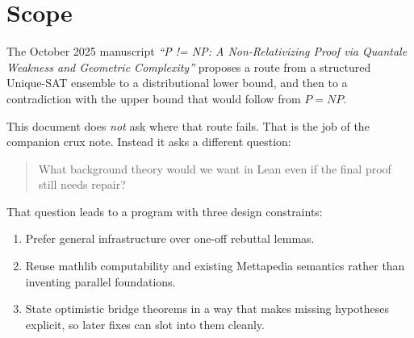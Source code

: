 \documentclass[11pt]{article}
\theoremstyle{remark}
\begin{document}
\begin{abstract}
extractor is reused across the switched family and only the downstream combiner
varies, then the code budget collapses to the combiner alone.
The Meredith-side limit is now considerably sharper.  The currently formalized
weakness bridge exports only global evidence scalars, so any predictor factoring
only through those summaries is constant on the whole state space.  The current
exact HML layer is infinitary by default: if the certified minimal-context type
is infinite, then even the depth-1 fragment is infinite, and the concrete rho
instance already realizes that case.  And one layer below exact HML, the
concrete rho present-moment surface already realizes arbitrary finite
membership patterns on a natural probe slice: a single-output probe state
against a flat bag of input guards records exactly which channels are present in
the environment.
On the semantic side, it now includes a depth-bounded GSLT/HML observational
kernel, a bridge from bisimulation quotients to quantale weakness, and a first
concrete minimal-context instance for the rho calculus.  This isolates the exact
positive shape that a successful switching theorem would need: not mere
locality, but locality together with a concrete compression theorem, a clean
finite learning interface, and an explicit observational/evidence semantics.
\end{abstract}

\tableofcontents

\section{Scope}

The October 2025 manuscript
\emph{``P != NP: A Non-Relativizing Proof via Quantale Weakness and Geometric
Complexity''} proposes a route from a structured Unique-SAT ensemble to a
distributional lower bound, and then to a contradiction with the upper bound that
would follow from $P=NP$.

This document does \emph{not} ask where that route fails.  That is the job of the
companion crux note.  Instead it asks a different question:

\begin{quote}
What background theory would we want in Lean even if the final proof still needs
repair?
\end{quote}

That question leads to a program with three design constraints:
\begin{enumerate}[leftmargin=1.5em]
  \item Prefer general infrastructure over one-off rebuttal lemmas.
  \item Reuse mathlib computability and existing Mettapedia semantics rather than
  inventing parallel foundations.
  \item State optimistic bridge theorems in a way that makes missing hypotheses
  explicit, so later fixes can slot into them cleanly.
\end{enumerate}
\end{document}
